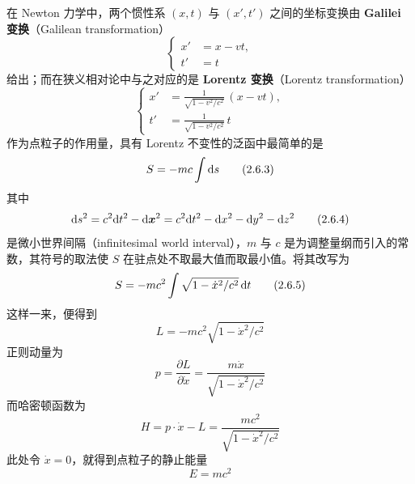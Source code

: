 在 Newton 力学中，两个惯性系 $(x,t)$ 与 $(x',t')$ 之间的坐标变换由 \textbf{Galilei 变换}（Galilean transformation）
\begin{equation}
  \left\{
  \begin{aligned}
    x' &= x-vt,\\
    t' &= t
  \end{aligned}
  \right.
  \tag{2.6.1}
\end{equation}
给出；而在狭义相对论中与之对应的是 \textbf{Lorentz 变换}（Lorentz transformation）
\begin{equation}
  \left\{
  \begin{aligned}
    x' &= \frac{1}{\sqrt{1-v^2/c^2}}\,(x-vt),\\
    t' &= \frac{1}{\sqrt{1-v^2/c^2}}\,t
  \end{aligned}
  \right.
  \tag{2.6.2}
\end{equation}
作为点粒子的作用量，具有 Lorentz 不变性的泛函中最简单的是
\begin{equation}
  S = -mc\int \mathrm{d} s
  \tag{2.6.3}
\end{equation}
其中
\begin{equation}
  \mathrm{d} s^2 = c^2\mathrm{d} t^2-\mathrm{d}\bm{x}^2 = c^2\mathrm{d} t^2-\mathrm{d} x^2-\mathrm{d} y^2-\mathrm{d} z^2
  \tag{2.6.4}
\end{equation}
是微小世界间隔（infinitesimal world interval），$m$ 与 $c$ 是为调整量纲而引入的常数，其符号的取法使 $S$ 在驻点处不取最大值而取最小值。将其改写为
\begin{equation}
  S = -mc^2\int\sqrt{1-\dot{x}^2/c^2}\,\mathrm{d} t
  \tag{2.6.5}
\end{equation}
这样一来，便得到
\begin{equation}
  L = -mc^2\sqrt{1-\dot{x}^2/c^2}
  \tag{2.6.6}
\end{equation}
正则动量为
\begin{equation}
  p = \frac{\partial L}{\partial\dot{x}} = \frac{m\dot{x}}{\sqrt{1-\dot{x}^2/c^2}}
  \tag{2.6.7}
\end{equation}
而哈密顿函数为
\begin{equation}
  H = p\cdot\dot{x}-L = \frac{mc^2}{\sqrt{1-\dot{x}^2/c^2}}
  \tag{2.6.8}
\end{equation}
此处令 $\dot{x}=0$，就得到点粒子的静止能量
\begin{equation}
  E = mc^2
  \tag{2.6.9}
\end{equation}


